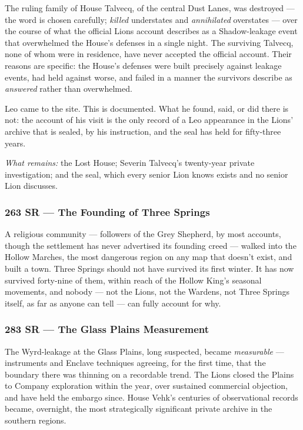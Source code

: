 The ruling family of House Talvecq, of the central Dust Lanes, was destroyed --- the word is chosen carefully; \textit{killed} understates and \textit{annihilated} overstates --- over the course of what the official Lions account describes as a Shadow-leakage event that overwhelmed the House's defenses in a single night. The surviving Talvecq, none of whom were in residence, have never accepted the official account. Their reasons are specific: the House's defenses were built precisely against leakage events, had held against worse, and failed in a manner the survivors describe as \textit{answered} rather than overwhelmed.

Leo came to the site. This is documented. What he found, said, or did there is not: the account of his visit is the only record of a Leo appearance in the Lions' archive that is sealed, by his instruction, and the seal has held for fifty-three years.

\textit{What remains:} the Lost House; Severin Talvecq's twenty-year private investigation; and the seal, which every senior Lion knows exists and no senior Lion discusses.

\subsubsection{263 SR --- The Founding of Three Springs}

A religious community --- followers of the Grey Shepherd, by most accounts, though the settlement has never advertised its founding creed --- walked into the Hollow Marches, the most dangerous region on any map that doesn't exist, and built a town. Three Springs should not have survived its first winter. It has now survived forty-nine of them, within reach of the Hollow King's seasonal movements, and nobody --- not the Lions, not the Wardens, not Three Springs itself, as far as anyone can tell --- can fully account for why.

\subsubsection{283 SR --- The Glass Plains Measurement}

The Wyrd-leakage at the Glass Plains, long suspected, became \textit{measurable} --- instruments and Enclave techniques agreeing, for the first time, that the boundary there was thinning on a recordable trend. The Lions closed the Plains to Company exploration within the year, over sustained commercial objection, and have held the embargo since. House Vehk's centuries of observational records became, overnight, the most strategically significant private archive in the southern regions.

